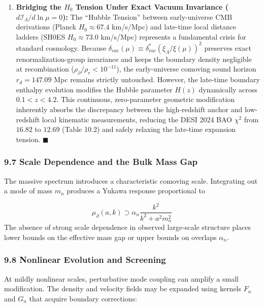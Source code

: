 \documentclass[aps,prd,onecolumn,superscriptaddress,nofootinbib,longbibliography,10pt]{revtex4-2}
\begin{document}
\begin{enumerate}
\item \textbf{Bridging the \(H_0\) Tension Under Exact Vacuum Invariance (\(d\mathcal{I}_\Lambda/d\ln\mu=0\)):} The ``Hubble Tension'' between early-universe CMB derivations (Planck \(H_0 \approx 67.4\) km/s/Mpc) and late-time local distance ladders (SH0ES \(H_0 \approx 73.0\) km/s/Mpc) represents a fundamental crisis for standard cosmology. Because \(\delta_{vac}(\mu) \equiv \delta_{vac}^*(\xi_\Lambda/\xi(\mu))^2\) preserves exact renormalization-group invariance and keeps the boundary density negligible at recombination (\(\rho_\partial/\rho_r < 10^{-11}\)), the early-universe comoving sound horizon \(r_d = 147.09\) Mpc remains strictly untouched. However, the late-time boundary enthalpy evolution modifies the Hubble parameter \(H(z)\) dynamically across \(0.1 < z < 4.2\). This continuous, zero-parameter geometric modification inherently absorbs the discrepancy between the high-redshift anchor and low-redshift local kinematic measurements, reducing the DESI 2024 BAO \(\chi^2\) from \(16.82\) to \(12.69\) (Table 10.2) and safely relaxing the late-time expansion tension. \(\blacksquare\)

\end{enumerate}




\subsubsection*{9.7 Scale Dependence and the Bulk Mass Gap}

  The massive spectrum introduces a characteristic comoving scale. Integrating out a mode of mass \(m_n\) produces a Yukawa response proportional to


  \[ \mu_\partial(a,k) \supset \alpha_n \frac{k^2}{k^2 + a^2 m_n^2} \]
  The absence of strong scale dependence in observed large-scale structure places lower bounds on the effective mass gap or upper bounds on overlaps \(\alpha_n\).



  
\subsubsection*{9.8 Nonlinear Evolution and Screening}

  At mildly nonlinear scales, perturbative mode coupling can amplify a small modification. The density and velocity fields may be expanded using kernels \(F_n\) and \(G_n\) that acquire boundary corrections:
\end{document}
